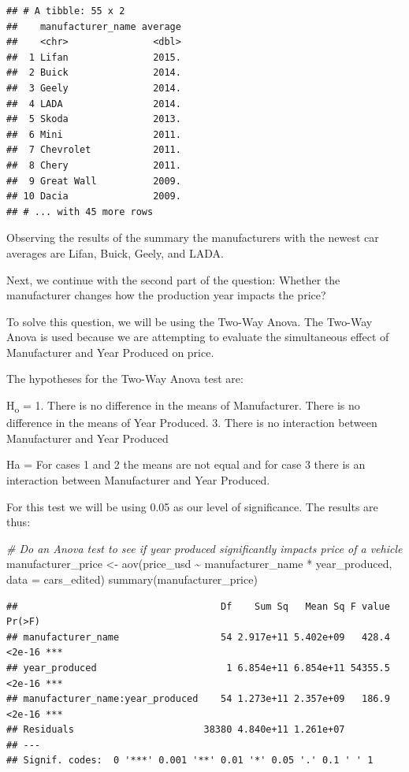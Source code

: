 \documentclass[
]{article}
\newenvironment{Shaded}{\begin{snugshade}}{\end{snugshade}}
\newcommand{\AttributeTok}[1]{\textcolor[rgb]{0.77,0.63,0.00}{#1}}
\newcommand{\CommentTok}[1]{\textcolor[rgb]{0.56,0.35,0.01}{\textit{#1}}}
\newcommand{\FunctionTok}[1]{\textcolor[rgb]{0.00,0.00,0.00}{#1}}
\newcommand{\NormalTok}[1]{#1}
\newcommand{\OtherTok}[1]{\textcolor[rgb]{0.56,0.35,0.01}{#1}}
\newcommand{\SpecialCharTok}[1]{\textcolor[rgb]{0.00,0.00,0.00}{#1}}
\begin{document}
\begin{verbatim}
## # A tibble: 55 x 2
##    manufacturer_name average
##    <chr>               <dbl>
##  1 Lifan               2015.
##  2 Buick               2014.
##  3 Geely               2014.
##  4 LADA                2014.
##  5 Skoda               2013.
##  6 Mini                2011.
##  7 Chevrolet           2011.
##  8 Chery               2011.
##  9 Great Wall          2009.
## 10 Dacia               2009.
## # ... with 45 more rows
\end{verbatim}

Observing the results of the summary the manufacturers with the newest
car averages are Lifan, Buick, Geely, and LADA.

Next, we continue with the second part of the question: Whether the
manufacturer changes how the production year impacts the price?

To solve this question, we will be using the Two-Way Anova. The Two-Way
Anova is used because we are attempting to evaluate the simultaneous
effect of Manufacturer and Year Produced on price.

The hypotheses for the Two-Way Anova test are:

H\textsubscript{o} = 1. There is no difference in the means of
Manufacturer. There is no difference in the means of Year Produced. 3.
There is no interaction between Manufacturer and Year Produced

Ha = For cases 1 and 2 the means are not equal and for case 3 there is
an interaction between Manufacturer and Year Produced.

For this test we will be using 0.05 as our level of significance. The
results are thus:

\begin{Shaded}
\begin{Highlighting}[]
\CommentTok{\# Do an Anova test to see if year produced significantly impacts price of a vehicle}
\NormalTok{manufacturer\_price }\OtherTok{\textless{}{-}} \FunctionTok{aov}\NormalTok{(price\_usd }\SpecialCharTok{\textasciitilde{}}\NormalTok{ manufacturer\_name }\SpecialCharTok{*}\NormalTok{ year\_produced, }\AttributeTok{data =}\NormalTok{ cars\_edited)}
\FunctionTok{summary}\NormalTok{(manufacturer\_price)}
\end{Highlighting}
\end{Shaded}

\begin{verbatim}
##                                    Df    Sum Sq   Mean Sq F value Pr(>F)    
## manufacturer_name                  54 2.917e+11 5.402e+09   428.4 <2e-16 ***
## year_produced                       1 6.854e+11 6.854e+11 54355.5 <2e-16 ***
## manufacturer_name:year_produced    54 1.273e+11 2.357e+09   186.9 <2e-16 ***
## Residuals                       38380 4.840e+11 1.261e+07                   
## ---
## Signif. codes:  0 '***' 0.001 '**' 0.01 '*' 0.05 '.' 0.1 ' ' 1
\end{verbatim}
\end{document}
